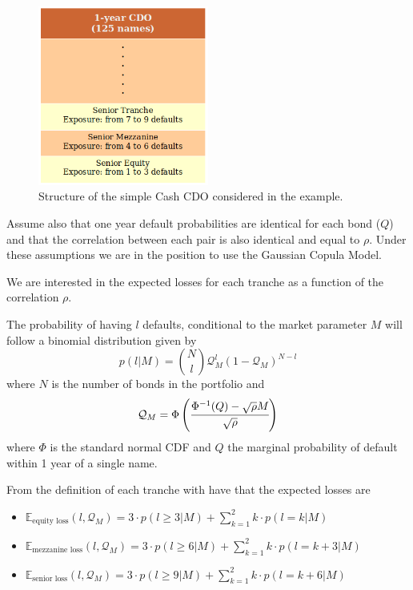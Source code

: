\begin{figure}[htb]
	\centering
	\includegraphics[width=0.5\textwidth]{figures/ex_cdo_1}
	\caption{Structure of the simple Cash CDO considered in the example.}
	\label{fig:cdo_ex_1}
\end{figure}

Assume also that one year default probabilities are identical for each bond ($Q$) and that the correlation between each pair is also identical and equal to $\rho$. Under these assumptions we are in the position to use the Gaussian Copula Model. 

We are interested in the expected losses for each tranche as a function of the correlation $\rho$.

The probability of having $l$ defaults, conditional to the market parameter $M$ will follow a binomial distribution given by
\begin{equation}
p(l|M) = \binom{N}{l}\mathcal{Q}_M^l (1-\mathcal{Q}_M)^{N-l}
\label{eq:def_prob_ex_cdo_1}
\end{equation}
where $N$ is the number of bonds in the portfolio and 
\begin{equation}
\mathcal{Q}_M = \Phi\left(\cfrac{\Phi^{-1}(Q)-\sqrt{\rho}M}{\sqrt{\-\rho}}\right)
\end{equation}
where $\Phi$ is the standard normal CDF and $Q$ the marginal probability of default within 1 year of a single name.

From the definition of each tranche with have that the expected losses are
\begin{itemize}
	\item $\mathbb{E}_{\textrm{equity loss}}(l, \mathcal{Q}_M)=3\cdot p(l\ge 3|M) + \sum_{k=1}^{2}k\cdot p(l=k|M)$
	\item $\mathbb{E}_{\textrm{mezzanine loss}}(l, \mathcal{Q}_M)=3\cdot p(l\ge 6|M) + \sum_{k=1}^{2}k\cdot p(l=k+3|M)$
	\item $\mathbb{E}_{\textrm{senior loss}}(l, \mathcal{Q}_M)=3\cdot p(l\ge 9|M) + \sum_{k=1}^{2}k\cdot p(l=k+6|M)$
\end{itemize}
	

